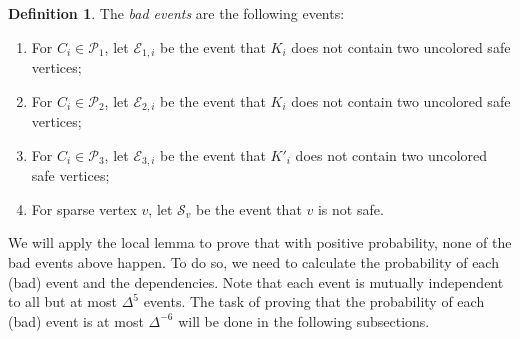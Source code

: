 \documentclass[12pt]{article}
\theoremstyle{definition}
\newtheorem{definition}[theorem]{Definition}
\begin{document}
\begin{definition}
The {\it bad events} are the following events: 
\begin{enumerate}[$(i)$]
\item For $C_i\in \mathcal{P}_1$, let $\mathcal{E}_{1,i}$ be the event that $K_i$ does not contain two uncolored safe vertices;
\item For $C_i\in \mathcal{P}_2$, let $\mathcal{E}_{2, i}$ be the event that $K_i$ does not contain two uncolored safe vertices;
\item For $C_i\in \mathcal{P}_3$, let $\mathcal{E}_{3, i}$ be the event that $K'_i$ does not contain two uncolored safe vertices;
\item For sparse vertex $v$, let $\mathcal{S}_v$ be the event that $v$ is not safe.
\end{enumerate}
\end{definition}

We will apply the local lemma to prove that with positive probability, none of the bad events above happen. To do so, we need to calculate the probability of each (bad) event and the dependencies. Note that each event is mutually independent to all but at most $\Delta^5$ events. The task of proving that the probability of each (bad) event is at most $\Delta^{-6}$ will be done in the following subsections.

\end{document}
